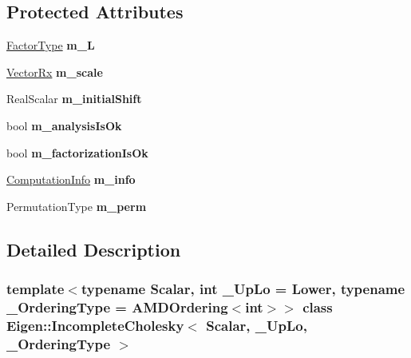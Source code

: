 \subsection*{Protected Attributes}
\begin{DoxyCompactItemize}
\item 
\mbox{\label{class_eigen_1_1_incomplete_cholesky_ac9bb29d22c7a1ecbb32212d9ea228b40}} 
\mbox{\hyperlink{class_eigen_1_1_sparse_matrix}{Factor\+Type}} {\bfseries m\+\_\+L}
\item 
\mbox{\label{class_eigen_1_1_incomplete_cholesky_aa4281d82edea96d9b2c7f696140c7401}} 
\mbox{\hyperlink{class_eigen_1_1_matrix}{Vector\+Rx}} {\bfseries m\+\_\+scale}
\item 
\mbox{\label{class_eigen_1_1_incomplete_cholesky_a3a42e45e865228d446a3c6b49f474e87}} 
Real\+Scalar {\bfseries m\+\_\+initial\+Shift}
\item 
\mbox{\label{class_eigen_1_1_incomplete_cholesky_a5f034fe49d026dfef22a97a403d8aa4c}} 
bool {\bfseries m\+\_\+analysis\+Is\+Ok}
\item 
\mbox{\label{class_eigen_1_1_incomplete_cholesky_aab7215c08a43657abdaef848c3b90947}} 
bool {\bfseries m\+\_\+factorization\+Is\+Ok}
\item 
\mbox{\label{class_eigen_1_1_incomplete_cholesky_abe5b6ad3c0a85dcd824a00697b490eac}} 
\mbox{\hyperlink{group__enums_ga85fad7b87587764e5cf6b513a9e0ee5e}{Computation\+Info}} {\bfseries m\+\_\+info}
\item 
\mbox{\label{class_eigen_1_1_incomplete_cholesky_acf5b562033401cd9b308259cd91a663e}} 
Permutation\+Type {\bfseries m\+\_\+perm}
\end{DoxyCompactItemize}


\subsection{Detailed Description}
\subsubsection*{template$<$typename Scalar, int \+\_\+\+Up\+Lo = Lower, typename \+\_\+\+Ordering\+Type = A\+M\+D\+Ordering$<$int$>$$>$\newline
class Eigen\+::\+Incomplete\+Cholesky$<$ Scalar, \+\_\+\+Up\+Lo, \+\_\+\+Ordering\+Type $>$}

